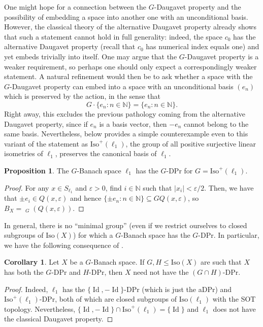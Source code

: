 \documentclass[a4paper,12pt]{amsart}
\theoremstyle{definition}
\newtheorem{proposition}[theorem]{Proposition}
\newtheorem{corollary}[theorem]{Corollary}
\theoremstyle{definition}
\theoremstyle{remark}
\numberwithin{equation}{section}
\newcommand{\N}{\mathbb{N}}
\newcommand{\clco}{\mathop{\overline{\mathrm{co}}}\nolimits}
\newcommand{\Iso}{\mathrm{Iso}}
\DeclareMathOperator{\id}{Id}
\renewcommand{\leq}{\leqslant}
\newcommand{\<}{\langle}
\renewcommand{\>}{\rangle}
\newcommand{\abs}[1]{\left\vert#1\right\vert}
\newcommand{\e}{\varepsilon}
\newcommand{\eps}{\e}
\begin{document}
	
	One might hope for a connection between the $G$-Daugavet property and the possibility of embedding a space into another one with an unconditional basis. However, the classical theory of the alternative Daugavet property already shows that such a statement cannot hold in full generality: indeed, the space $c_0$ has the alternative Daugavet property (recall that $c_0$ has numerical index equals one) and yet embeds trivially into itself. One may argue that the $G$-Daugavet property is a weaker requirement, so perhaps one should only expect a correspondingly weaker statement. A natural refinement would then be to ask whether a space with the $G$-Daugavet property can embed into a space with an unconditional basis $(e_n)$ which is preserved by the action, in the sense that
	\begin{equation*} 
		G\cdot \{e_n : n\in \mathbb N\}=\{e_n : n\in \mathbb N\}.
	\end{equation*}
	Right away, this excludes the previous pathology coming from the alternative Daugavet property, since if $e_n$ is a basis vector, then $-e_n$ cannot belong to the same basis. Nevertheless,  below provides a simple counterexample even to this variant of the statement as $\Iso^+(\ell_1)$, the group of all positive surjective linear isometries of $\ell_1$, preserves the canonical basis of $\ell_1$.
	
	\begin{proposition} \label{ex:Iso^+(ell_1)}
		The $G$-Banach space $\ell_1$ has the $G$-DPr for $G = \Iso^+(\ell_1)$.
	\end{proposition}
	\begin{proof}
		For any $x \in S_{\ell_1}$ and $\eps > 0$, find $i \in \N$ such that $\abs{x_i} < \eps/2$. Then, we have that $\pm e_i \in Q(x,\eps)$ and hence $\{\pm e_n : n \in \N\} \subseteq G Q(x,\eps)$, so $B_X = \clco_G(Q(x,\eps))$.
	\end{proof}
	
	In general, there is no ``minimal group'' (even if we restrict ourselves to closed subgroups of $\Iso(X)$) for which a $G$-Banach space has the $G$-DPr. In particular, we have the following consequence of .
	
	\begin{corollary} \label{cor:intersectionInstability}
		Let $X$ be a $G$-Banach space. If $G, H \leq \Iso(X)$ are such that $X$ has both the $G$-DPr and $H$-DPr, then $X$ need not have the $(G \cap H)$-DPr.
	\end{corollary}
	\begin{proof}
		Indeed, $\ell_1$ has the $\{\id, -\id\}$-DPr (which is just the aDPr) and $\Iso^+(\ell_1)$-DPr, both of which are closed subgroups of $\Iso(\ell_1)$ with the SOT topology. Nevertheless, $\{\id, -\id\} \cap \Iso^+(\ell_1) = \{\id\}$ and $\ell_1$ does not have the classical Daugavet property.
	\end{proof}
	
\end{document}
